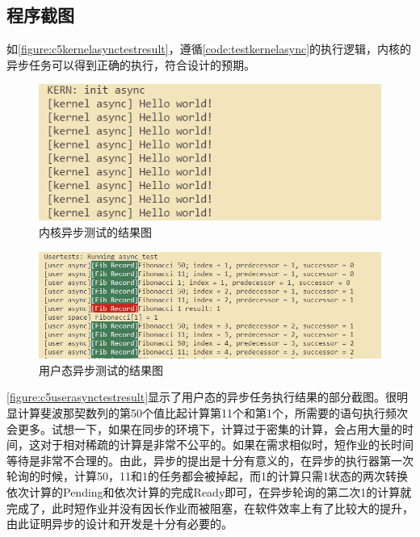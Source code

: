 \subsection{程序截图}
如\autoref{figure:c5kernelasynctestresult}，遵循\autoref{code:testkernelasync}的执行逻辑，内核的异步任务可以得到正确的执行，符合设计的预期。

\begin{figure}[htb]
    \figureCapSet
    \centering
    \includegraphics[scale=0.5]{figure/c5/kernelasynctestresult.png}
    \caption{内核异步测试的结果图}
    \label{figure:c5kernelasynctestresult}
\end{figure}
\begin{figure}[htb]
    \figureCapSet
    \centering
    \includegraphics[scale=0.5]{figure/c5/userasynctestresult.png}
    \caption{用户态异步测试的结果图}
    \label{figure:c5userasynctestresult}
\end{figure}
\autoref{figure:c5userasynctestresult}显示了用户态的异步任务执行结果的部分截图。很明显计算斐波那契数列的第50个值比起计算第11个和第1个，所需要的语句执行频次会更多。试想一下，如果在同步的环境下，计算过于密集的计算，会占用大量的时间，这对于相对稀疏的计算是非常不公平的。如果在需求相似时，短作业的长时间等待是非常不合理的。由此，异步的提出是十分有意义的，在异步的执行器第一次轮询的时候，计算50，11和1的任务都会被掉起，而1的计算只需1状态的两次转换依次计算的Pending和依次计算的完成Ready即可，在异步轮询的第二次1的计算就完成了，此时短作业并没有因长作业而被阻塞，在软件效率上有了比较大的提升，由此证明异步的设计和开发是十分有必要的。